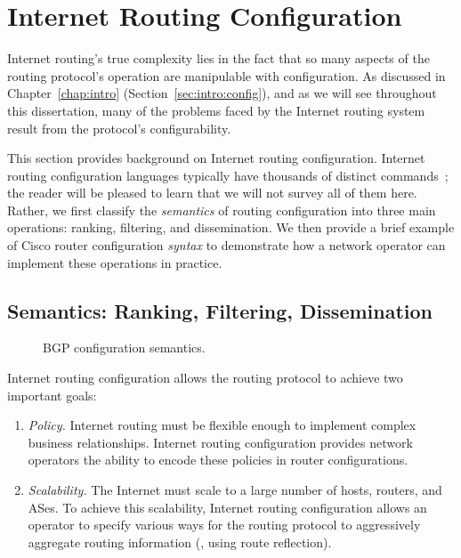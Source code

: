 
\section{Internet Routing Configuration}\label{sec:conf}

Internet routing's true complexity
lies in the fact that so many aspects of the routing protocol's
operation are manipulable with configuration.  
As discussed in Chapter~\ref{chap:intro}
(Section~\ref{sec:intro:config}), and as we will see throughout this
dissertation, many of the problems faced by the Internet routing system result
from the protocol's configurability.


This section provides background on Internet routing configuration.
Internet routing configuration languages typically have thousands of
distinct commands~\cite{www-cisco-ios-master}; the reader will be
pleased to learn that we will not survey all of them here.  Rather, we
first classify the {\em semantics} of routing configuration into three
main operations: ranking, filtering, and dissemination.  We then provide
a brief example of Cisco router configuration {\em syntax} to
demonstrate how a network operator can implement these
operations in practice.

\subsection{Semantics: Ranking, Filtering, Dissemination}
\label{sec:semantics}

\begin{figure}
\centering{}
\caption{BGP configuration semantics.}
\label{fig:overview}
\end{figure}

Internet routing configuration allows the routing protocol to achieve
two important goals:
\begin{enumerate}
\itemsep=-1pt
\item {\em Policy.}  
Internet routing must be flexible enough to implement complex business
relationships.  Internet routing configuration provides network
operators the ability to encode these policies in router configurations.
\item {\em Scalability.} The Internet must scale to a large number of
hosts, routers, and ASes.  To achieve this scalability, Internet
routing configuration allows an operator to specify various ways for the
routing protocol to aggressively aggregate routing information (\eg,
using route reflection).
\end{enumerate}

